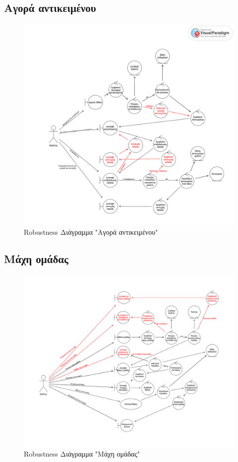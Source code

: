 \subsection{Αγορά αντικειμένου}
\begin{figure}[!htb]
  \begin{center}
    \includegraphics[width=\textwidth]{robust_shop.png}
    \caption{Robustness Διάγραμμα "Αγορά αντικειμένου"}
    \label{}
     \end{center}
\end{figure}
\newpage


\subsection{Μάχη ομάδας}
\begin{figure}[!htb]
  \begin{center}
    \includegraphics[width=\textwidth]{robust_teambattle.png}
    \caption{Robustness Διάγραμμα "Μάχη ομάδας"}
    \label{}
     \end{center}
\end{figure}